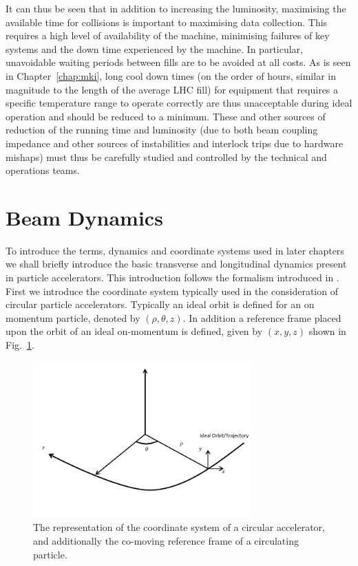 It can thus be seen that in addition to increasing the luminosity, maximising the available time for collisions is important to maximising data collection. This requires a high level of availability of the machine, minimising failures of key systems and the down time experienced by the machine. In particular, unavoidable waiting periods between fills are to be avoided at all costs. As is seen in Chapter~\ref{chap:mki}, long cool down times (on the order of hours, similar in magnitude to the length of the average LHC fill) for equipment that requires a specific temperature range to operate correctly are thus unacceptable during ideal operation and should be reduced to a minimum. These and other sources of reduction of the running time and luminosity (due to both beam coupling impedance and other sources of instabilities and interlock trips due to hardware mishaps) must thus be carefully studied and controlled by the technical and operations teams.

\section{Beam Dynamics}

To introduce the terms, dynamics and coordinate systems used in later chapters we shall briefly introduce the basic transverse and longitudinal dynamics present in particle accelerators. This introduction follows the formalism introduced in \cite{Holzer:TransDyn}. First we introduce the coordinate system typically used in the consideration of circular particle accelerators. Typically an ideal orbit is defined for an on momentum particle, denoted by $(\rho, \theta, z)$. In addition a reference frame placed upon the orbit of an ideal on-momentum is defined, given by $(x, y, z)$ shown in Fig.~\ref{fig:accel-coord-system}. 

\begin{figure}
\begin{center}
\includegraphics[width=0.75\textwidth]{Introduction/figures/coordinate-system.pdf}
\end{center}
\label{fig:accel-coord-system}
\caption{The representation of the coordinate system of a circular accelerator, and additionally the co-moving reference frame of a circulating particle.}
\end{figure}

